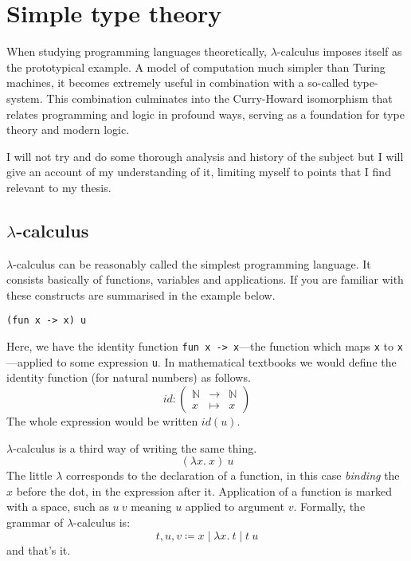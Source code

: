 \chapter{Simple type theory}

When studying programming languages theoretically, \(\lambda\)-calculus imposes
itself as the prototypical example. A model of computation much simpler than
Turing machines, it becomes extremely useful in combination with a so-called
type-system. This combination culminates into the Curry-Howard isomorphism that
relates programming and logic in profound ways, serving as a foundation for
type theory and modern logic.

I will not try and do some thorough analysis and history of the subject but I
will give an account of my understanding of it, limiting myself to points that
I find relevant to my thesis.

\section{\(\lambda\)-calculus}

\(\lambda\)-calculus can be reasonably called the simplest programming language.
It consists basically of functions, variables and applications.
If you are familiar with \ocaml these constructs are summarised in the example
below.
\begin{verbatim}
(fun x -> x) u
\end{verbatim}
Here, we have the identity function \texttt{fun x -> x}---\ie the
function which maps \texttt{x} to \texttt{x}---applied to
some expression \texttt{u}.
In mathematical textbooks we would define the identity function (for natural
numbers) as follows.
\[
  \mathit{id} :
  \left(
  \begin{array}{lcl}
    \mathbb{N} &\to& \mathbb{N} \\
    x &\mapsto& x
  \end{array}
  \right)
\]
The whole expression would be written \(\mathit{id}(u)\).

\(\lambda\)-calculus is a third way of writing the same thing.
\[
  (\lambda x.\ x)\ u
\]
The little \(\lambda\) corresponds to the declaration of a function, in this
case \emph{binding} the \(x\) before the dot, in the expression after it.
Application of a function is marked with a space, such as \(u\ v\) meaning
\(u\) applied to argument \(v\).
Formally, the grammar of \(\lambda\)-calculus is:
\[
  t, u, v \coloneqq x \mid \lambda x.\ t \mid t\ u
\]
and that's it.

